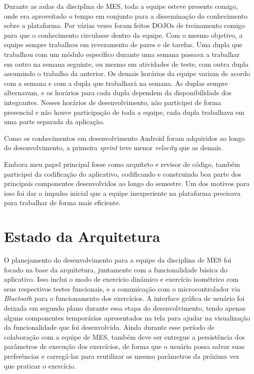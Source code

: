 Durante as aulas da disciplina de MES, toda a equipe esteve presente comigo, onde era aproveitado o tempo em conjunto para a disseminação do conhecimento sobre a plataforma. Por várias vezes foram feitos DOJOs de treinamento comigo para que o conhecimento circulasse dentro da equipe. Com o mesmo objetivo, a equipe sempre trabalhou em revezamento de pares e de tarefas. Uma dupla que trabalhou com um módulo específico durante uma semana passava a trabalhar em outro na semana seguinte, ou mesmo em atividades de teste, com outra dupla assumindo o trabalho da anterior. Os demais horários da equipe variam de acordo com a semana e com a dupla que trabalhará na semana. As duplas sempre alternavam, e os horários para cada dupla dependem da disponibilidade dos integrantes. Nesses horários de desenvolvimento, não participei de forma presencial e não houve participação de toda a equipe, cada dupla trabalhava em uma parte separada da aplicação.

Como os conhecimentos em desenvolvimento Android foram adquiridos ao longo do desenvolvimento, a primeira \textit{sprint} teve menor \textit{velocity} que as demais.

Embora meu papel principal fosse como arquiteto e revisor de código, também participei da codificação do aplicativo, codificando e construindo boa parte dos principais componentes desenvolvidos ao longo do semestre. Um dos motivos para isso foi dar o impulso inicial que a equipe inexperiente na plataforma precisava para trabalhar de forma mais eficiente.

\section{Estado da Arquitetura}

O planejamento do desenvolvimento para a equipe da disciplina de MES foi focado na base da arquitetura, juntamente com a funcionalidade básica do aplicativo. Isso inclui o modo de exercício dinâmico e exercício isométrico com seus respectivos testes funcionais, e a comunicação com o microcontrolador via \textit{Bluetooth} para o funcionamento dos exercícios. A interface gráfica de usuário foi deixada em segundo plano durante essa etapa do desenvolvimento, tendo apenas alguns componentes temporários apresentados na tela para ajudar na visualização da funcionalidade que foi desenvolvida. Ainda durante esse período de colaboração com a equipe de MES, também deve ser entregue a persistência dos parâmetros de execução dos exercícios, de forma que o usuário possa salvar suas preferências e carregá-las para reutilizar os mesmo parâmetros da próxima vez que praticar o exercício.

